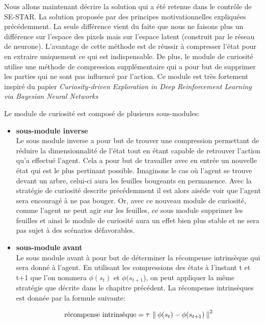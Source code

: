 Nous allons maintenant décrire la solution qui a été retenue dans le contrôle de SE-STAR. La solution proposée par des principes motivationnelles expliquées précédemment. La seule différence vient du faite que nous ne faisons plus un différence sur l'espace des pixels mais sur l'espace latent (construit par le réseau de neurone). L'avantage de cette méthode est de réussir à compresser l'état pour en extraire uniquement ce qui est indispensable. De plus, le module de curiosité utilise une méthode de compression supplémentaire qui a pour but de supprimer les parties qui ne sont pas influencé par l'action. Ce module est très fortement inspiré du papier \emph{Curiosity-driven Exploration in Deep Reinforcement Learning via Bayesian Neural Networks}\cite{curiositydriven}


Le module de curiosité est composé de plusieurs sous-modules:

\begin{itemize}
    \item \textbf{sous-module inverse}\\
        Le sous module inverse a pour but de trouver une compression permettant de réduire la dimensionnalité de l'état tout en étant capable de retrouver l'action qu'a effectué l'agent. Cela a pour but de travailler avec en entrée un nouvelle état qui est le plus pertinant possible. Imaginons le cas où l'agent se trouve devant un arbre, celui-ci aura les feuilles bougeants en permanence. Avec la stratégie de curiosité descrite précédemment il est alors aiséde voir que l'agent sera encouragé à ne pas bouger. Or, avec ce nouveau module de curiosité, comme l'agent ne peut agir sur les feuilles, ce sous module supprimer les feuilles et ainsi le module de curiosité aura un effet bien plus stable et ne sera pas sujet à des scénarios défavorables.
    \item \textbf{sous-module avant}\\
        Le sous module avant à pour but de déterminer la récompense intrinsèque qui sera donné à l'agent.
        En utilisant les compressions des états à l'instant t et t+1 que l'on nommera $\phi(s_t)$ et $\phi(s_{t+1}$), on peut appliquer la même stratégie que décrite dans le chapitre précédent. La récompense intrinsèques est donnée par la formule suivante:

\begin{equation}\label{eqn:hierarchicalcuriosity}
    \text{récompense intrinsèque} = \tau\: \left\lVert\:  \phi(s_t) - \phi(s_{t+1})  \:\right\rVert^2 
\end{equation}

\end{itemize}

